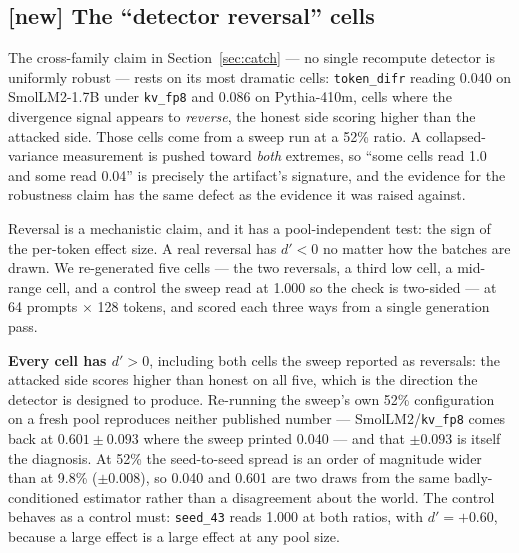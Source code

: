 \documentclass[11pt]{article}
\newcommand{\td}{\texttt{token\_difr}}
\begin{document}
\subsection{[new] The ``detector reversal'' cells}
\label{sec:reversal}

The cross-family claim in Section~\ref{sec:catch} --- no single recompute detector
is uniformly robust --- rests on its most dramatic cells: \td{} reading 0.040 on
SmolLM2-1.7B under \texttt{kv\_fp8} and 0.086 on Pythia-410m, cells where the
divergence signal appears to \emph{reverse}, the honest side scoring higher than the
attacked side. Those cells come from a sweep run at a 52\% ratio. A collapsed-variance
measurement is pushed toward \emph{both} extremes, so ``some cells read 1.0 and some
read 0.04'' is precisely the artifact's signature, and the evidence for the robustness
claim has the same defect as the evidence it was raised against.

Reversal is a mechanistic claim, and it has a pool-independent test: the sign of the
per-token effect size. A real reversal has $d' < 0$ no matter how the batches are
drawn. We re-generated five cells --- the two reversals, a third low cell, a
mid-range cell, and a control the sweep read at 1.000 so the check is two-sided ---
at 64 prompts $\times$ 128 tokens, and scored each three ways from a single
generation pass.

\begin{table}[h]
\centering\small

\caption{[new] None of the reversals is real. Each cell re-generated at
8{,}192 tokens and scored three ways from one pass: at the sweep's own 52\%
configuration (reproduced as a sub-pool so only the pool size differs), at a
legitimate 9.8\% ratio, and by the pool-independent per-token effect size $d'$.
\td{}, 5 protocol seeds.}
\label{tab:reversal}
\end{table}

\textbf{Every cell has $d' > 0$}, including both cells the sweep reported as
reversals: the attacked side scores higher than honest on all five, which is the
direction the detector is designed to produce. Re-running the sweep's own 52\%
configuration on a fresh pool reproduces neither published number ---
SmolLM2/\texttt{kv\_fp8} comes back at $0.601 \pm 0.093$ where the sweep printed
0.040 --- and that $\pm 0.093$ is itself the diagnosis. At 52\% the seed-to-seed
spread is an order of magnitude wider than at 9.8\% ($\pm 0.008$), so 0.040 and
0.601 are two draws from the same badly-conditioned estimator rather than a
disagreement about the world. The control behaves as a control must: \texttt{seed\_43}
reads 1.000 at both ratios, with $d' = +0.60$, because a large effect is a large
effect at any pool size.
\end{document}

